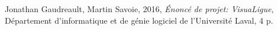 %

\begin{thebibliographyUL}{99}
     Jonathan Gaudreault, Martin Savoie, 2016, \emph{Énoncé de projet: VisuaLigue}, Département d'informatique et de génie logiciel de l'Université Laval, 4 p.
\end{thebibliographyUL}
